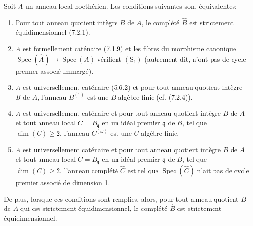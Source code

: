 \begin{theorem}[7.2.5]
\label{IV.2.s7.2.5-fr}
Soit $A$ un anneau local noethérien. Les conditions suivantes sont
équivalentes:
\begin{enumerate}
\item[a)] Pour tout anneau quotient intègre $B$ de $A$, le complété
$\widehat B$ est strictement équidimensionnel (7.2.1).
\item[b)] $A$ est formellement caténaire (7.1.9) et les fibres du morphisme
canonique $\operatorname{Spec}(\widehat A)\to\operatorname{Spec}(A)$
vérifient $(\mathrm S_1)$ (autrement dit, n'ont pas de cycle premier associé
immergé).
\item[c)] $A$ est universellement caténaire (5.6.2) et pour tout anneau
quotient intègre $B$ de $A$, l'anneau $B^{(1)}$ est une $B$-algèbre finie
(cf. (7.2.4)).
\item[d)] $A$ est universellement caténaire et pour tout anneau quotient
intègre $B$ de $A$ et tout anneau local $C=B_{\mathfrak q}$ en un idéal
premier $\mathfrak q$ de $B$, tel que $\dim(C)\geqslant2$, l'anneau
$C^{(\omega)}$ est une $C$-algèbre finie.
\item[e)] $A$ est universellement caténaire et pour tout anneau quotient
intègre $B$ de $A$ et tout anneau local $C=B_{\mathfrak q}$ en un idéal
premier $\mathfrak q$ de $B$, tel que $\dim(C)\geqslant2$, l'anneau complété
$\widehat C$ est tel que $\operatorname{Spec}(\widehat C)$ n'ait pas de
cycle premier associé de dimension 1.
\end{enumerate}
De plus, lorsque ces conditions sont remplies, alors, pour tout anneau
quotient $B$ de $A$ qui est strictement équidimensionnel, le complété
$\widehat B$ est strictement équidimensionnel.
\end{theorem}

